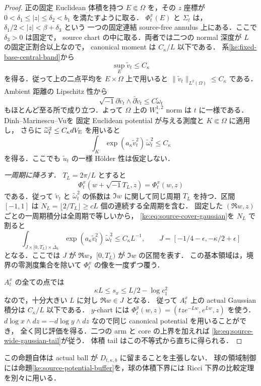 \begin{proof}
正の固定 Euclidean 体積を持つ $E\Subset\Omega$ を，その $z$ 座標が
$0<\delta_1\le|z|\le\delta_2<b_1$ を満たすように取る．
$\Phi^x_t(E)$ と $\Sigma_t$ は，$\delta_1/2<|z|<\beta+\delta_3$ という
一つの固定連結 source-free annulus 上にある．ここで $\delta_3>0$ は固定で，
source chart の中に取る．両者では二つの normal 深度が $L$ の固定正割合以上なので，
canonical moment は $C_\kappa/L$ 以下である．
系\ref{ke:fixed-base-central-band}から
\[
 \sup_E\widetilde v_t\le C_\kappa
\]
を得る．従って上の二点平均を $E\times\Omega$ 上で用いると
$\|\widetilde v_t\|_{L^2(\Omega)}\le C_\kappa$ である．
Ambient 距離の Lipschitz 性から
\[
 \sqrt{-1}\partial\widetilde v_t\wedge\bar\partial\widetilde v_t
 \le C\widetilde\omega_t
\]
もほとんど至る所で成り立つ．よって $\Omega$ 上の $W_*^{1,2}$ norm は
$t$ に一様である．Dinh--Marinescu--Vu\cite[Theorem~1.2]{DMVMT}を
固定 Euclidean potential が与える測度と $K\Subset\Omega$ に適用し，
さらに $\widetilde\omega_t^2\le C_\kappa dV_{\rm E}$ を用いると
\begin{equation}\label{ke:eq:source-cover-gaussian}
 \int_K\exp(a_\kappa\widetilde v_t^2)\,\widetilde\omega_t^2
 \le C_\kappa
\end{equation}
を得る．ここでも $\widetilde u_t$ の一様 H\"older 性は仮定しない．

\emph{一周期に降ろす．}
$T_L=2\pi/L$ とすると
\[
 \Phi^x_t(w+\sqrt{-1}T_L,z)=\Phi^x_t(w,z)
\]
である．従って $\widetilde v_t$ と $\widetilde\omega_t^2$ の係数は
$\Im w$ に関して同じ周期 $T_L$ を持つ．区間 $[-1,1]$ は
$N_L=\lfloor2/T_L\rfloor\ge cL$ 個の連続する全周期を含む．
固定した $(\Re w,z)$ ごとの一周期積分は全周期で等しいから，
\eqref{ke:eq:source-cover-gaussian}を $N_L$ で割ると
\[
 \int_{J\times[0,T_L)\times\overline\Delta_b}
       \exp(a_\kappa\widetilde v_t^2)\,\widetilde\omega_t^2
 \le C_\kappa L^{-1},
 \qquad J=[-1/4-\epsilon,-\kappa/2+\epsilon]
\]
となる．ここでは $J$ が $\Re w$，$[0,T_L)$ が $\Im w$ の区間を表す．
この基本領域は，境界の零測度集合を除いて $\Phi^x_t$ の像を一度ずつ覆う．

$A^x_t$ の全ての点では
\[
 \kappa L\le s_x\le L/2-\log c_1^2
\]
なので，十分大きい $L$ に対し $\Re w\in J$ となる．
従って $A^x_t$ 上の actual Gaussian 積分は $C_\kappa/L$ 以下である．
$y$-chart には $\Phi^y_t(w,z)=(tze^{-Lw},e^{Lw},z)$ を使う．
$d\log x\wedge dz=-d\log y\wedge dz$ なので同じ canonical potential を用いることができ，
全く同じ評価を得る．二つの arm と core の上界を加えれば
\eqref{ke:eq:source-wide-gaussian-tail}が従う．
体積 tail はこの不等式から直ちに得られる．
\end{proof}

この命題自体は actual ball が $D_{t,\kappa,b}$ に留まることを主張しない．
球の領域制御には命題\ref{ke:source-potential-buffer}を，球の体積下界には
Ricci 下界の比較定理を別々に用いる．
